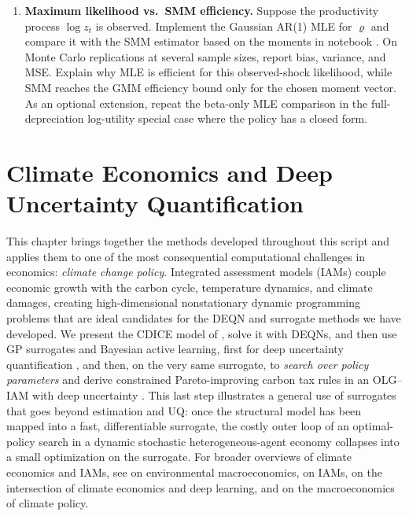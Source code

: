 \documentclass[11pt,a4paper]{report}
\begin{document}
\begin{enumerate}[itemsep=4pt, leftmargin=*]
\item\label{ex:ch10:7} \textbf{Maximum likelihood vs.\ SMM efficiency.}  Suppose the productivity process $\log z_t$ is observed.  Implement the Gaussian AR(1) MLE for $\varrho$ and compare it with the SMM estimator based on the moments in notebook .  On Monte Carlo replications at several sample sizes, report bias, variance, and MSE.  Explain why MLE is efficient for this observed-shock likelihood, while SMM reaches the GMM efficiency bound only for the chosen moment vector.  As an optional extension, repeat the beta-only MLE comparison in the full-depreciation log-utility special case where the policy has a closed form.
\end{enumerate}


\chapter{Climate Economics and Deep Uncertainty Quantification}
\label{ch:climate}

This chapter brings together the methods developed throughout this script and applies them to one of the most consequential computational challenges in economics: \emph{climate change policy}.  Integrated assessment models (IAMs) couple economic growth with the carbon cycle, temperature dynamics, and climate damages, creating high-dimensional nonstationary dynamic programming problems that are ideal candidates for the DEQN and surrogate methods we have developed.  We present the CDICE model of \citet{Folini_2021}, solve it with DEQNs, and then use GP surrogates and Bayesian active learning, first for deep uncertainty quantification \citep{friedlDeep2023}, and then, on the very same surrogate, to \emph{search over policy parameters} and derive constrained Pareto-improving carbon tax rules in an OLG--IAM with deep uncertainty \citep{kubler2025using}.  This last step illustrates a general use of surrogates that goes beyond estimation and UQ: once the structural model has been mapped into a fast, differentiable surrogate, the costly outer loop of an optimal-policy search in a dynamic stochastic heterogeneous-agent economy collapses into a small optimization on the surrogate.  For broader overviews of climate economics and IAMs, see \citet{hassler2016environmental} on environmental macroeconomics, \citet{DIETZ20241} on IAMs, \citet{fernandezvillaverde2025climate} on the intersection of climate economics and deep learning, and \citet{vanderploegrezai2026climate} on the macroeconomics of climate policy.
\end{document}
